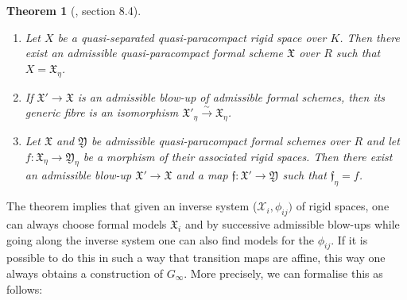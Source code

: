 \documentclass[11pt,oneside]{amsart}
\newtheorem{theorem}{Theorem}[section]
\theoremstyle{definition}
\theoremstyle{remark}
\begin{document}
	\begin{theorem}[\cite{Bosch lectures}, section 8.4]
		\leavevmode
		\begin{enumerate}
			
			\item Let $X$ be a quasi-separated quasi-paracompact rigid space over $K$. Then there exist an admissible quasi-paracompact formal scheme $\mathfrak X$ over $R$ such that $X=\mathfrak X_\eta$.
			\item If $\mathfrak X'\rightarrow \mathfrak X$ is an admissible blow-up of admissible formal schemes, then its generic fibre is an isomorphism $\mathfrak X'_\eta \xrightarrow{\sim} \mathfrak X_\eta$.
			\item Let $\mathfrak X$ and $\mathfrak Y$ be admissible quasi-paracompact formal schemes over $R$ and let $f:\mathfrak X_\eta \rightarrow \mathfrak Y_\eta$ be a morphism of their associated rigid spaces. Then there exist an admissible blow-up $\mathfrak X'\rightarrow \mathfrak X$ and a map $\mathfrak f:\mathfrak X'\rightarrow \mathfrak Y$ such that $\mathfrak f_\eta = f$.
			\begin{center}
				
			\end{center}
		\end{enumerate}
	\end{theorem}
	
	The theorem implies that given an inverse system ($\mathcal X_i,\phi_{ij})$ of rigid spaces, one can always choose formal models $\mathfrak X_i$ and by successive admissible blow-ups while going along the inverse system one can also find models for the $\phi_{ij}$. If it is possible to do this in such a way that transition maps are affine, this way one always obtains a construction of $G_\infty$. More precisely, we can formalise this as follows:
	
\end{document}
